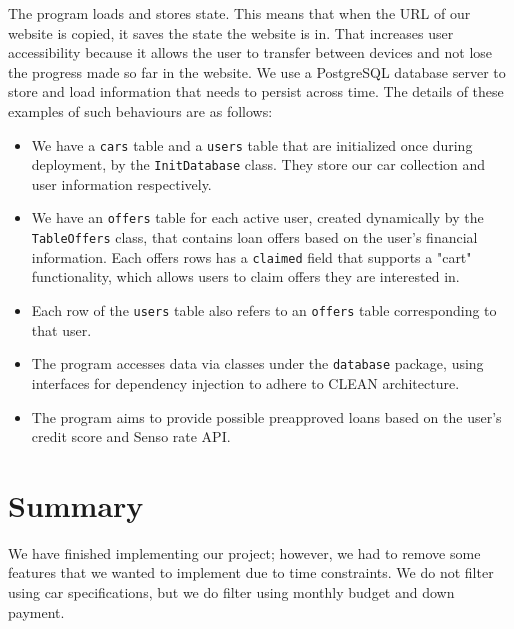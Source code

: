\documentclass[fontsize=14pt]{article}
\begin{document}
The program loads and stores state. This means that when the URL of our website is copied, it saves the state the website is in. That increases user accessibility because it allows the user to transfer between devices and not lose the progress made so far in the website. We use a PostgreSQL database server to store and load information that needs to persist across time.  
The details of these examples of such behaviours are as follows:   
\begin{itemize}
    \item We have a \texttt{cars} table and a \texttt{users} table that are initialized once during deployment, by the \texttt{InitDatabase} class. They store our car collection and user information respectively. 
    \item We have an \texttt{offers} table for each active user, created dynamically by the \texttt{TableOffers} class, that contains loan offers based on the user's financial information. Each offers rows has a \texttt{claimed} field that supports a "cart" functionality, which allows users to claim offers they are interested in.
    \item Each row of the \texttt{users} table also refers to an \texttt{offers} table corresponding to that user.
    \item The program accesses data via classes under the \texttt{database} package, using interfaces for dependency injection to adhere to CLEAN architecture.
    \item The program aims to provide possible preapproved loans based on the user's credit score and Senso rate API.
\end{itemize}




\section*{Summary}
We have finished implementing our project; however, we had to remove some features that we wanted to implement due to time constraints. We do not filter using car specifications, but we do filter using monthly budget and down payment.
\end{document}
